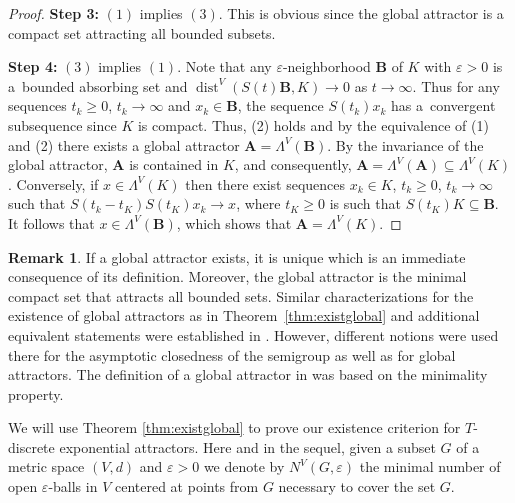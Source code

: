 \documentclass[a4paper,12pt,reqno]{amsart}
\theoremstyle{plain}
\theoremstyle{definition}
\newtheorem{rem}[lem]{Remark}
\numberwithin{equation}{section}
\newcommand{\eps}{\varepsilon}
\newcommand{\dist}{\operatorname{dist}}
\renewcommand{\geq}{\geqslant}
\begin{document}
\begin{proof}
\textbf{Step 3:} $(1)$ implies $(3)$.
This is obvious since the global attractor is a compact set attracting all bounded subsets.

\textbf{Step 4:} $(3)$ implies $(1)$.
Note that any $\eps$-neighborhood $\mathbf{B}$ of $K$ with $\eps>0$ is a~bounded absorbing set
and $\dist^{V}(S(t)\mathbf{B},K)\to 0$ as $t\to\infty$. Thus for any sequences $t_{k}\geq 0$, $t_{k}\to\infty$ and $x_{k}\in \mathbf{B}$,
the sequence $S(t_{k})x_{k}$ has a~convergent subsequence since $K$ is compact. Thus, (2) holds and by the equivalence of (1) and (2) there exists a global attractor $\mathbf{A}=\Lambda^{V}(\mathbf{B})$.
By the invariance of the global attractor, $\mathbf{A}$ is contained in $K$, and consequently, $\mathbf{A}=\Lambda^{V}(\mathbf{A})\subseteq\Lambda^{V}(K)$. Conversely, if $x\in\Lambda^{V}(K)$
then there exist sequences $x_k\in K$, $t_k\geq0$, $t_{k}\to\infty$ such that $S(t_k-t_{K})S(t_{K})x_k\to x$, where $t_K\geq 0$ is such that
$S(t_{K})K\subseteq \mathbf{B}$. It follows that $x\in\Lambda^{V}(\mathbf{B})$, which shows that $\mathbf{A}=\Lambda^{V}(K)$.
\end{proof}

\begin{rem}
If a global attractor exists, it is unique which is an immediate consequence of its definition. Moreover, the global attractor is the minimal compact set that attracts all bounded sets. Similar characterizations for the existence of global attractors as in Theorem~\ref{thm:existglobal} and additional equivalent statements were established in \cite{ChCoPa}. However, different notions were used there for the asymptotic closedness of the semigroup as well as for global attractors. The definition of a global attractor in \cite{ChCoPa} was based on the minimality property. 
\end{rem}

We will use Theorem \ref{thm:existglobal} to prove our existence criterion for $T$-discrete exponential attractors. 
Here and in the sequel, given a subset $G$ of a metric space $(V,d)$ and $\eps>0$ we denote by $N^{V}(G,\eps)$ the minimal number of open $\eps$-balls in $V$ centered at points from $G$ necessary to cover the set $G$. 
\end{document}
